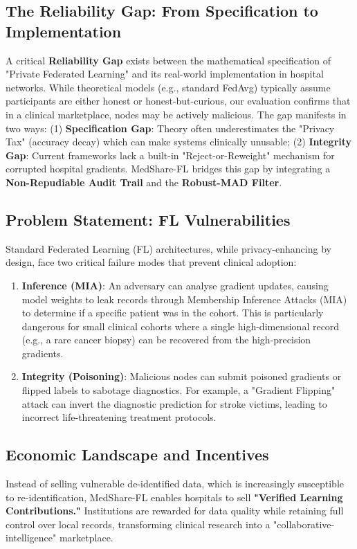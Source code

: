 \documentclass[10pt, a4paper, twocolumn]{article}
\begin{document}
\subsection{The Reliability Gap: From Specification to Implementation}
A critical \textbf{Reliability Gap} exists between the mathematical specification of "Private Federated Learning" and its real-world implementation in hospital networks. While theoretical models (e.g., standard FedAvg) typically assume participants are either honest or honest-but-curious, our evaluation confirms that in a clinical marketplace, nodes may be actively malicious. The gap manifests in two ways: (1) \textbf{Specification Gap}: Theory often underestimates the "Privacy Tax" (accuracy decay) which can make systems clinically unusable; (2) \textbf{Integrity Gap}: Current frameworks lack a built-in "Reject-or-Reweight" mechanism for corrupted hospital gradients. MedShare-FL bridges this gap by integrating a \textbf{Non-Repudiable Audit Trail} and the \textbf{Robust-MAD Filter}.

\subsection{Problem Statement: FL Vulnerabilities}
Standard Federated Learning (FL) architectures, while privacy-enhancing by design, face two critical failure modes that prevent clinical adoption:
\begin{enumerate}
    \item \textbf{Inference (MIA)}:  An adversary can analyse gradient updates, causing model weights to leak records through Membership Inference Attacks (MIA) to determine if a specific patient was in the cohort. This is particularly dangerous for small clinical cohorts where a single high-dimensional record (e.g., a rare cancer biopsy) can be recovered from the high-precision gradients.
    \item \textbf{Integrity (Poisoning)}: Malicious nodes can submit poisoned gradients or flipped labels to sabotage diagnostics. For example, a "Gradient Flipping" attack can invert the diagnostic prediction for stroke victims, leading to incorrect life-threatening treatment protocols.
\end{enumerate}

\subsection{Economic Landscape and Incentives}
Instead of selling vulnerable de-identified data, which is increasingly susceptible to re-identification, MedShare-FL enables hospitals to sell \textbf{"Verified Learning Contributions."} Institutions are rewarded for data quality while retaining full control over local records, transforming clinical research into a "collaborative-intelligence" marketplace.
\end{document}

